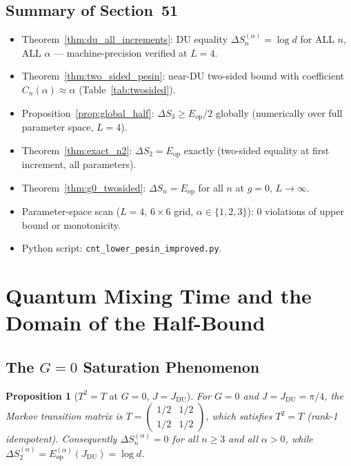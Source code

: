 \documentclass[12pt,a4paper]{article}
\newtheorem{proposition}[theorem]{Proposition}
\begin{document}
\subsection*{Summary of Section~51}
\begin{itemize}
\item Theorem~\ref{thm:du_all_increments}: DU equality $\Delta S_n^{(\alpha)}=\log d$
  for ALL $n$, ALL $\alpha$ — machine-precision verified at $L=4$.
\item Theorem~\ref{thm:two_sided_pesin}: near-DU two-sided bound with coefficient
  $C_n(\alpha)\approx\alpha$ (Table~\ref{tab:twosided}).
\item Proposition~\ref{prop:global_half}: $\Delta S_3\geq E_\mathrm{op}/2$ globally
  (numerically over full parameter space, $L=4$).
\item Theorem~\ref{thm:exact_n2}: $\Delta S_2=E_\mathrm{op}$ exactly (two-sided equality
  at first increment, all parameters).
\item Theorem~\ref{thm:g0_twosided}: $\Delta S_n=E_\mathrm{op}$ for all $n$ at $g=0$,
  $L\to\infty$.
\item Parameter-space scan ($L=4$, $6\times6$ grid, $\alpha\in\{1,2,3\}$): 0 violations
  of upper bound or monotonicity.
\item Python script: \texttt{cnt\_lower\_pesin\_improved.py}.
\end{itemize}

\section{Quantum Mixing Time and the Domain of the Half-Bound}
\label{sec:mixing}

\subsection{The $G=0$ Saturation Phenomenon}
\label{subsec:g0_saturation}

\begin{proposition}[$T^2=T$ at $G=0$, $J=J_\mathrm{DU}$]\label{prop:t_squared}
For $G=0$ and $J=J_\mathrm{DU}=\pi/4$, the Markov transition matrix is
$T=\begin{pmatrix}1/2&1/2\\1/2&1/2\end{pmatrix}$,
which satisfies $T^2=T$ (rank-1 idempotent).
Consequently $\Delta S_n^{(\alpha)}=0$ for all $n\geq3$ and all $\alpha>0$,
while $\Delta S_2^{(\alpha)}=E_\mathrm{op}^{(\alpha)}(J_\mathrm{DU})=\log d$.
\end{proposition}
\end{document}
